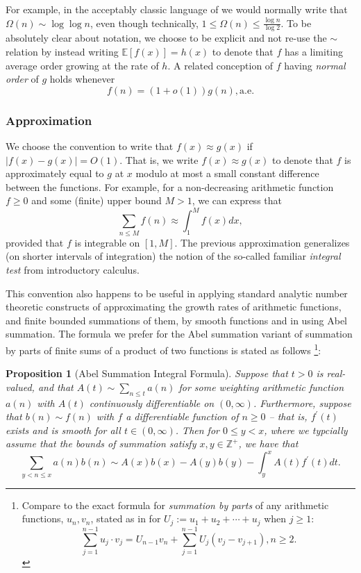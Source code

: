 \documentclass[11pt,reqno,a4letter]{article}
\numberwithin{figure}{section}
\numberwithin{table}{section}
\newcommand{\cf}{\textit{cf.\ }}
\theoremstyle{plain}
\newtheorem{prop}[theorem]{Proposition}
\numberwithin{theorem}{section}
\theoremstyle{definition}
\begin{document}
For example, in the acceptably classic language of \cite{HARDYWRIGHT} we would normally write that 
$\Omega(n) \sim \log\log n$, even though technically, 
$1 \leq \Omega(n) \leq \frac{\log n}{\log 2}$. 
To be absolutely clear about notation, we choose to be explicit and not re-use the $\sim$ relation by 
instead writing $\mathbb{E}[f(x)] = h(x)$ to denote that $f$ has a limiting average order growing at the 
rate of $h$. A related conception of $f$ having \emph{normal order} of $g$ holds whenever 
$$f(n) = (1+o(1)) g(n), \mathrm{a.e.}$$
            
\subsubsection{Approximation} 
     
We choose the convention to write that $f(x) \approx g(x)$ if $|f(x) - g(x)| = O(1)$. 
That is, we write $f(x) \approx g(x)$ to denote that $f$ is approximately equal to $g$ at $x$ modulo at most a
small constant difference between the functions. 
For example, for a non-decreasing arithmetic function $f \geq 0$ and some (finite) upper bound $M > 1$, we can express that 
\[
\sum_{n \leq M} f(n) \approx \int_1^{M} f(x) dx, 
\]
provided that $f$ is integrable on $[1, M]$. 
The previous approximation generalizes (on shorter intervals of integration) 
the notion of the so-called familiar \emph{integral test} from introductory calculus. 

This convention also happens to be useful in applying standard analytic number theoretic 
constructs of approximating the growth rates of arithmetic functions, and finite bounded summations of them, by 
smooth functions and in using Abel summation. The formula we prefer for the Abel summation variant of summation by parts 
of finite sums of a product of two functions is stated as follows 
\cite[\cf \S 4.3]{APOSTOLANUMT} \footnote{
     Compare to the exact formula for \emph{summation by parts} of any arithmetic functions, $u_n,v_n$, 
     stated as in \cite[\S 2.10(ii)]{NISTHB} for $U_j := u_1+u_2+\cdots+u_j$ when $j \geq 1$: 
     \[
     \sum_{j=1}^{n-1} u_j \cdot v_j = U_{n-1} v_n + \sum_{j=1}^{n-1} U_j \left(v_j - v_{j+1}\right), n \geq 2. 
     \]
}: 
 
\begin{prop}[Abel Summation Integral Formula] 
\label{prop_AbelSummationFormula} 
Suppose that $t > 0$ is real-valued, and that $A(t) \sim \sum_{n \leq t} a(n)$ for some weighting 
arithmetic function $a(n)$ with $A(t)$ continuously differentiable on $(0, \infty)$. Furthermore, suppose that 
$b(n) \sim f(n)$ with $f$ a differentiable function of $n \geq 0$ -- that is, $f^{\prime}(t)$ exists and is smooth for all 
$t \in (0, \infty)$. 
Then for $0 \leq y < x$, where we typcially assume that the bounds of summation satisfy 
$x, y \in \mathbb{Z}^{+}$, we have that 
\[
\sum_{y < n \leq x} a(n) b(n) \sim A(x)b(x) - A(y)b(y) - \int_y^{x} A(t) f^{\prime}(t) dt. 
\] 
\end{prop}
\end{document}
